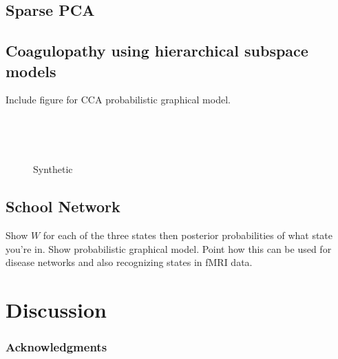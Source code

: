 \documentclass{article}
\begin{document}
\subsection{Sparse PCA}

\subsection{Coagulopathy using hierarchical subspace models}
Include figure for CCA probabilistic graphical model.

\begin{figure}
    \centering
    \begin{subfigure}[b]{0.3\textwidth}
        \caption{}
        \label{fig:nonHierPosteriors}
    \end{subfigure}
    ~ %
    \begin{subfigure}[b]{0.3\textwidth}
        \caption{}
        \label{fig:hierPosteriors}
    \end{subfigure}
    ~ %
    \begin{subfigure}[b]{0.3\textwidth}
        \caption{}
        \label{fig:posteriorCosAngle}
    \end{subfigure}
    \caption{Synthetic}\label{fig:ccaResults}
\end{figure}

\subsection{School Network}
Show $W$ for each of the three states then posterior probabilities of what state you're in. Show probabilistic graphical model. Point how this can be used for disease networks and also recognizing states in fMRI data.

\section{Discussion}

\subsubsection*{Acknowledgments}
\end{document}
